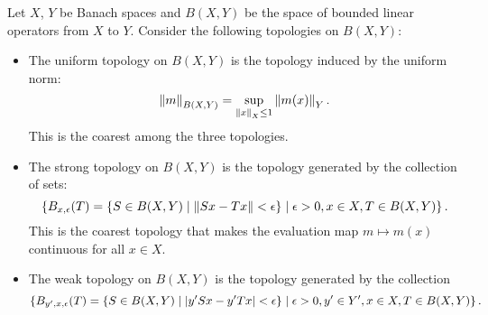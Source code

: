 \begin{remark}
    Let $X$, $Y$ be Banach spaces and $B(X, Y)$ be the space of bounded linear 
    operators from $X$ to $Y$. Consider the following topologies on $B(X,Y)$:
    \begin{itemize}
        \item The uniform topology on $B(X,Y)$ is the topology induced by the 
        uniform norm: 
        \begin{equation*}
            \left\lVert {m} \right\rVert_{B(X,Y)} = \sup_{\left\lVert {x} \right\rVert_X\leq 1} \left\lVert {m(x)} \right\rVert_Y.
        \end{equation*}
        This is the coarest among the three topologies.
        \item The strong topology on $B(X,Y)$ is the topology generated by the 
        collection of sets: 
        \begin{equation*}
            \left\{ B_{x,\epsilon}(T) = \left\{ S\in B(X,Y) \;\middle\vert\; \left\lVert {Sx - Tx} \right\rVert<\epsilon \right\} \;\middle\vert\; \epsilon>0, x\in X, T\in B(X,Y) \right\}.
        \end{equation*}
        This is the coarest topology that makes the evaluation map $m\mapsto m(x)$ 
        continuous for all $x\in X$.
        \item The weak topology on $B(X,Y)$ is the topology generated by the collection 
        \begin{equation*}
            \left\{ B_{y',x,\epsilon}(T) = \left\{ S\in B(X,Y) \;\middle\vert\; \left\lvert {y'Sx - y'Tx} \right\rvert<\epsilon \right\} \;\middle\vert\; \epsilon>0, y'\in Y', x\in X, T\in B(X,Y) \right\}.
        \end{equation*}
    \end{itemize}
\end{remark}
